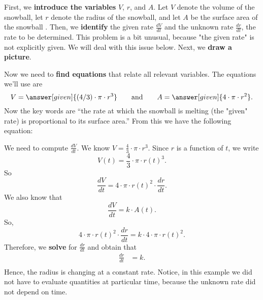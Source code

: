 \documentclass{ximera}
\begin{document}
\begin{example}
\begin{explanation}
First, we \textbf{introduce the variables} $V$, $r$, and $A$. Let $V$ denote the volume of the snowball, let $r$ denote the radius of the snowball, and  let $A$ be the surface area of the snowball . Then, we \textbf{identify} the given rate $\frac{dV}{dt}$  and the unknown rate $\frac{dr}{dt}$, the rate to be determined. This problem is a bit unusual, because "the given  rate" is not explicitly given. We will deal with this issue below. 
  Next, we \textbf{draw a picture}.
  \begin{image}
  \end{image}
  Now we need to \textbf{find equations} that relate all relevant variables. The equations we'll use are
  \[
  V = \answer[given]{(4/3) \cdot \pi \cdot r^3} \qquad\text{and}\qquad A = \answer[given]{4\cdot
  \pi \cdot r^2}.
  \]
  Now the key words are ``the rate at which the snowball is melting (the "given" rate) is
  proportional to its surface area.'' From this we have the following
  equation:
  \begin{image}
  \end{image}
  We need to compute  $\frac{dV}{dt}$. We know $V = \frac{4}{3}\cdot \pi\cdot
  r^3$. Since $r$ is a function of $t$, we  write 
    \[
  V(t) = \frac{4}{3}\cdot \pi\cdot r(t)^3.
  \]
So
  \[
  \frac{dV}{dt} = 4\cdot \pi\cdot r(t)^2 \cdot \frac{dr}{dt}.
  \]
  We also know that
   \[
 \frac{dV}{dt} = k\cdot A(t).
  \]
  So,
  \[
 4\cdot \pi \cdot r(t)^2 \cdot \frac{dr}{dt} =  k\cdot 4\cdot
  \pi \cdot r(t)^2 .
  \]
 Therefore, we \textbf{solve} for $\frac{dr}{dt}$ and obtain that
  \begin{align*}
\frac{dr}{dt} &=  k.\\
  \end{align*}
  Hence, the radius is changing at a constant rate. Notice, in this example we did not have to evaluate quantities at particular time,  because the unknown rate did not depend on time.
\end{explanation}
\end{example}
\end{document}
